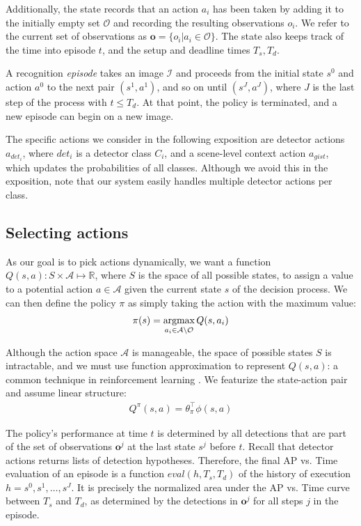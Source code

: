 Additionally, the state records that an action $a_i$ has been taken by adding it to the initially empty set $\mathcal{O}$ and recording the resulting observations $o_i$.
We refer to the current set of observations as $\mathbf{o} = \{o_i | a_i \in \mathcal{O}\}$.
The state also keeps track of the time into episode $t$, and the setup and deadline times $T_s,T_d$.

A recognition \emph{episode} takes an image $\mathcal{I}$ and proceeds from the initial state $s^0$ and action $a^0$ to the next pair $(s^1,a^1)$, and so on until $(s^J,a^J)$, where $J$ is the last step of the process with $t \le T_d$.
At that point, the policy is terminated, and a new episode can begin on a new image.

The specific actions we consider in the following exposition are detector actions $a_{{det}_i}$, where ${det}_i$ is a detector class $C_i$, and a scene-level context action $a_{gist}$, which updates the probabilities of all classes.
Although we avoid this in the exposition, note that our system easily handles multiple detector actions per class.

\subsection{Selecting actions} \label{sec:value}
As our goal is to pick actions dynamically, we want a function $Q(s,a): S \times \mathcal{A} \mapsto \mathbb{R}$, where $S$ is the space of all possible states, to assign a value to a potential action $a \in \mathcal{A}$ given the current state $s$ of the decision process.
We can then define the policy $\pi$ as simply taking the action with the maximum value:
\begin{align}
\pi(s) = \argmax_{a_i \in \mathcal{A} \setminus \mathcal{O}} Q(s,a_i)
\end{align}

Although the action space $\mathcal{A}$ is manageable, the space of possible states $S$ is intractable, and we must use function approximation to represent $Q(s,a)$: a common technique in reinforcement learning \cite{Sutton1998}.
We featurize the state-action pair and assume linear structure:
\begin{align}
Q^\pi(s,a) = \theta_\pi^\top \phi(s,a)
\end{align}

The policy's performance at time $t$ is determined by all detections that are part of the set of observations $\mathbf{o}^j$ at the last state $s^j$ before $t$.
Recall that detector actions returns lists of detection hypotheses.
Therefore, the final AP vs. Time evaluation of an episode is a function $eval(h,T_s,T_d)$ of the history of execution $h=s^0,s^1,\dots,s^J$.
It is precisely the normalized area under the AP vs. Time curve between $T_s$ and $T_d$, as determined by the detections in $\mathbf{o}^j$ for all steps $j$ in the episode.

